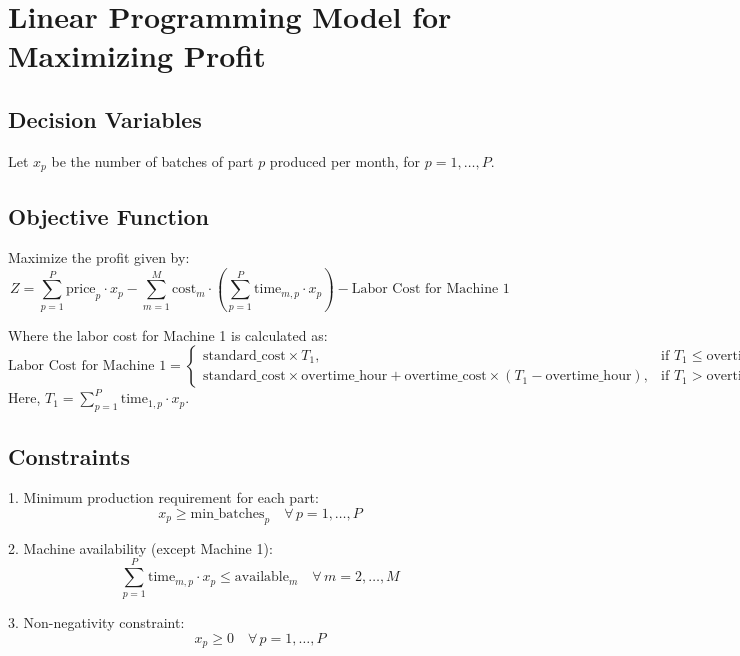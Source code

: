 \documentclass{article}
\begin{document}
\section*{Linear Programming Model for Maximizing Profit}

\subsection*{Decision Variables}
Let \( x_p \) be the number of batches of part \( p \) produced per month, for \( p = 1, \ldots, P \).

\subsection*{Objective Function}
Maximize the profit given by:
\[
Z = \sum_{p=1}^{P} \text{price}_{p} \cdot x_p - \sum_{m=1}^{M} \text{cost}_m \cdot \left( \sum_{p=1}^{P} \text{time}_{m,p} \cdot x_p \right) - \text{Labor Cost for Machine 1}
\]

Where the labor cost for Machine 1 is calculated as:
\[
\text{Labor Cost for Machine 1} = 
\begin{cases} 
\text{standard_cost} \times T_1, & \text{if } T_1 \leq \text{overtime_hour} \\
\text{standard_cost} \times \text{overtime_hour} + \text{overtime_cost} \times (T_1 - \text{overtime_hour}), & \text{if } T_1 > \text{overtime_hour}
\end{cases}
\]
Here, \( T_1 = \sum_{p=1}^{P} \text{time}_{1,p} \cdot x_p \).

\subsection*{Constraints}
1. Minimum production requirement for each part:
   \[
   x_p \geq \text{min_batches}_{p} \quad \forall \, p = 1, \ldots, P
   \]

2. Machine availability (except Machine 1):
   \[
   \sum_{p=1}^{P} \text{time}_{m,p} \cdot x_p \leq \text{available}_m \quad \forall \, m = 2, \ldots, M
   \]

3. Non-negativity constraint:
   \[
   x_p \geq 0 \quad \forall \, p = 1, \ldots, P
   \]
\end{document}

